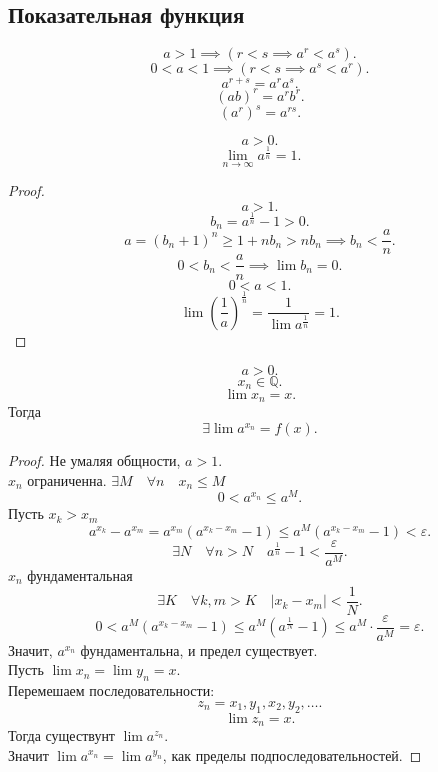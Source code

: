 \documentclass[11pt, oneside]{article}   	%
\begin{document}
    \subsection{Показательная функция}
    \[ a > 1 \implies \left( r < s \implies a^{r} < a^{s} \right)  .\]
    \[ 0 < a < 1 \implies \left( r < s \implies a^{s} < a^{r} \right)  .\]
    \[ a^{r+s} = a^{r}a^{s} .\]
    \[ (ab)^{r} = a^{r}b^{r} .\]
    \[ (a^{r})^{s} = a^{rs} .\]
    \begin{theorem}
        \[ a > 0.\]
        \[ \lim\limits_{n \to \infty} a^{\frac{1}{n}} = 1 .\]
        \begin{proof}
            \[ a > 1 .\] 
            \[ b_n = a^{\frac{1}{n}}-1 > 0 .\]
            \[ a = (b_n + 1)^{n} \ge  1 + nb_n > nb_n \implies b_n < \frac{a}{n} .\]
            \[ 0 < b_n < \frac{a}{n} \implies \lim b_n = 0 .\]
            \[ 0 < a < 1 .\]
            \[ \lim \left( \frac{1}{a} \right)^{\frac{1}{n}} = \frac{1}{\lim a^{\frac{1}{n}}} = 1  .\] 
        \end{proof}
    \end{theorem}
    \begin{theorem}
        \[ a > 0 .\]
        \[ x_n\in \mathbb{Q} .\]
        \[ \lim x_n = x .\]
        Тогда
        \[ \exists\lim a^{x_n} = f(x) .\]
        \begin{proof}
            Не умаляя общности, $a>1$.\\
            $x_n$ ограниченна. $\exists{M}\quad \forall{n}\quad x_n \le M  $
            \[ 0 < a^{x_n} \le a^{M}.\] 
            Пусть $x_k > x_m$
            \[ a^{x_k} - a^{x_m} = a^{x_m}(a^{x_k-x_m}-1) \le a^{M}\left( a^{x_k-x_m} -1 \right) < \varepsilon  .\]
            \[ \exists{N}\quad \forall{n>N}\quad a^{\frac{1}{n}}-1 < \frac{\varepsilon}{a^{M}} .\]
            $x_n$ фундаментальная
            \[ \exists{K}\quad \forall{k,m>K}\quad |x_k-x_m|<\frac{1}{N}   .\]
            \[ 0 < a^{M}\left( a^{x_k-x_m}-1 \right) \le a^{M}\left(a^{\frac{1}{N}} - 1\right) \le a^{M} \cdot \frac{\varepsilon}{a^{M}} = \varepsilon .\]
            Значит, $a^{x_n}$ фундаментальна, и предел существует.\\
            Пусть $\lim x_n = \lim y_n = x$.\\
            Перемешаем последовательности:
            \[ z_n = x_1, y_1, x_2, y_2, \ldots .\]
            \[ \lim z_n = x .\]
            Тогда существунт $\lim a^{z_n}$.\\
            Значит $\lim a^{x_n} = \lim a^{y_n}$, как пределы подпоследовательностей.
        \end{proof}
    \end{theorem}
\end{document}
